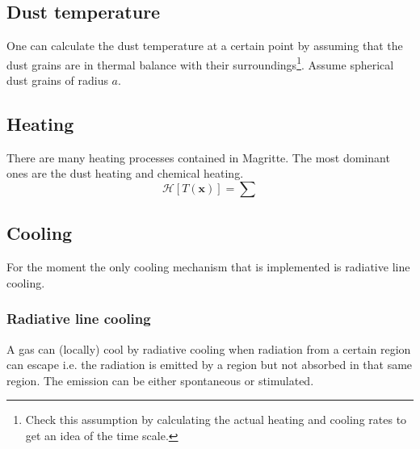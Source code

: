\documentclass[]{article}
\begin{document}
\subsection{Dust temperature}

One can calculate the dust temperature at a certain point by assuming that the dust grains are in thermal balance with their surroundings\footnote{Check this assumption by calculating the actual heating and cooling rates to get an idea of the time scale.}. Assume spherical dust grains of radius $a$.


\subsection{Heating}

There are many heating processes contained in Magritte. The most dominant ones are the dust heating and chemical heating.
\begin{equation}
  \mathcal{H}\left[T(\textbf{x})\right] = \sum
\end{equation}

\subsection{Cooling}

For the moment the only cooling mechanism that is implemented is radiative line cooling.

\subsubsection{Radiative line cooling}

A gas can (locally) cool by radiative cooling when radiation from a certain region can escape i.e. the radiation is emitted by a region but not absorbed in that same region. The emission can be either spontaneous or stimulated.

\bigskip
\end{document}
